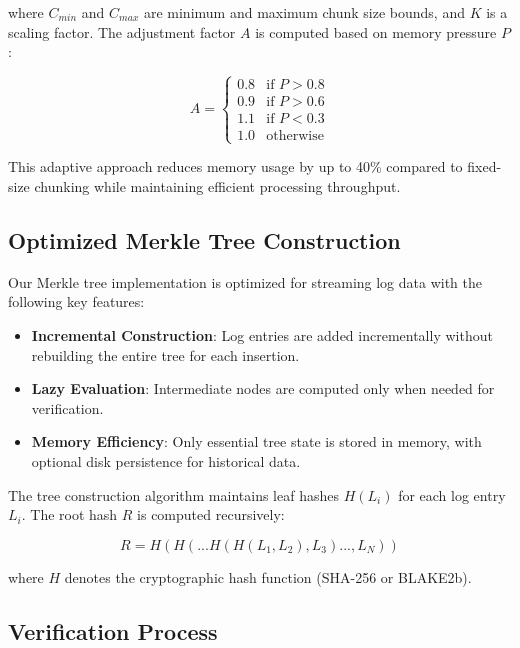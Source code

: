 \documentclass[a4paper,10pt]{article}
\begin{document}
where $C_{min}$ and $C_{max}$ are minimum and maximum chunk size bounds, and $K$ is a scaling factor. The adjustment factor $A$ is computed based on memory pressure $P$:

\begin{equation}
A = \begin{cases}
0.8 & \text{if } P > 0.8 \\
0.9 & \text{if } P > 0.6 \\
1.1 & \text{if } P < 0.3 \\
1.0 & \text{otherwise}
\end{cases}
\end{equation}

This adaptive approach reduces memory usage by up to 40\% compared to fixed-size chunking while maintaining efficient processing throughput.

\subsection{Optimized Merkle Tree Construction}

Our Merkle tree implementation is optimized for streaming log data with the following key features:

\begin{itemize}
\item \textbf{Incremental Construction}: Log entries are added incrementally without rebuilding the entire tree for each insertion.
\item \textbf{Lazy Evaluation}: Intermediate nodes are computed only when needed for verification.
\item \textbf{Memory Efficiency}: Only essential tree state is stored in memory, with optional disk persistence for historical data.
\end{itemize}

The tree construction algorithm maintains leaf hashes $H(L_i)$ for each log entry $L_i$. The root hash $R$ is computed recursively:

\begin{equation}
R = H(H(...H(H(L_1, L_2), L_3)..., L_N))
\end{equation}

where $H$ denotes the cryptographic hash function (SHA-256 or BLAKE2b).

\subsection{Verification Process}
\end{document}
